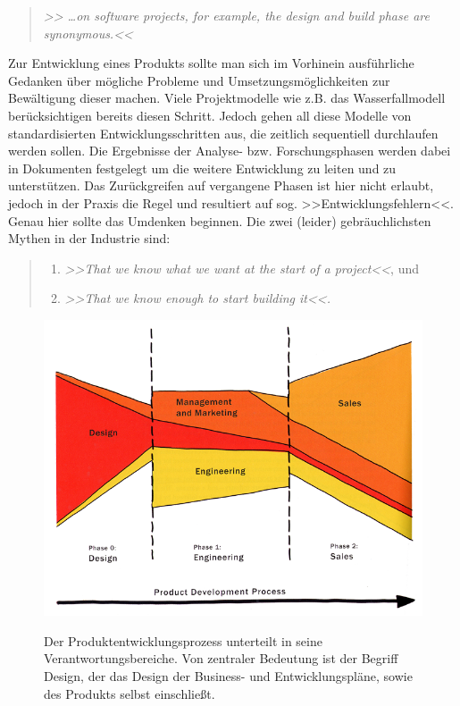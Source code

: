 \begin{quote}
	\emph{>> \ldots on software projects, for example, the design and build phase are synonymous.<<}
	\begin{flushright}\citep{Nokes:2003}\end{flushright}
\end{quote}

\medskip Zur Entwicklung eines Produkts sollte man sich im Vorhinein ausführliche Gedanken über mögliche Probleme und Umsetzungsmöglichkeiten zur Bewältigung dieser machen. Viele Projektmodelle wie z.B. das Wasserfallmodell berücksichtigen bereits diesen Schritt. Jedoch gehen all diese Modelle von standardisierten Entwicklungsschritten aus, die zeitlich sequentiell durchlaufen werden sollen. Die Ergebnisse der Analyse- bzw. Forschungsphasen werden dabei in Dokumenten festgelegt um die weitere Entwicklung zu leiten und zu unterstützen. Das Zurückgreifen auf vergangene Phasen ist hier nicht erlaubt, jedoch in der Praxis die Regel und resultiert auf sog. >>Entwicklungsfehlern<<.
Genau hier sollte das Umdenken beginnen. Die zwei (leider) gebräuchlichsten Mythen in der Industrie sind: 
\begin{quote}
	\begin{enumerate}
		\item \textsl{>>That we know what we want at the start of a project<<}, und
		\item \textsl{>>That we know enough to start building it<<.}
	\end{enumerate}
	\begin{flushright}\citep{Buxton:2007}\end{flushright}
\end{quote}

\begin{figure}
	\begin{center}
        {\includegraphics[width=0.85\linewidth]{gfx/buxtonProductDevProcess}}
	\end{center}
		\caption[Der Produktentwicklungsprozess \newline \citep{Buxton:2007}]{Der Produktentwicklungsprozess unterteilt in seine Verantwortungsbereiche. Von zentraler Bedeutung ist der Begriff Design, der das Design der Business- und Entwicklungspläne, sowie des Produkts selbst einschließt.}\label{fig:buxtonProductDevProcess}
\end{figure}

